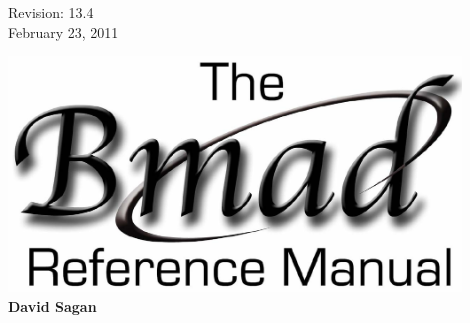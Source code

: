 \thispagestyle{empty}

\begin{flushright}
\large
  Revision: 13.4 \\
  February 23, 2011 \\
\end{flushright}

\vfill

{
\begin{center}
\includegraphics[width=12cm]{bmad-ref-manual.pdf} \\
\vskip 0.3in
\huge\bf David Sagan
\end{center}
}

\vfill
\break

